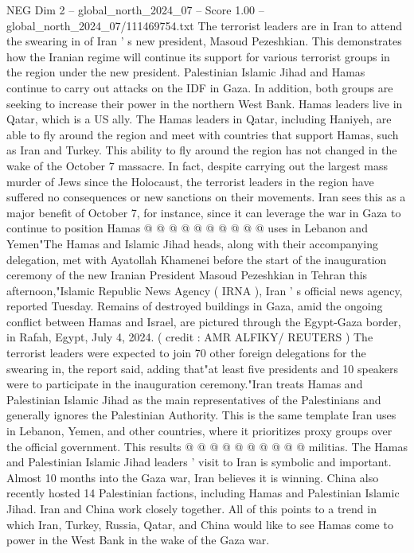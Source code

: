 \begin{textsample}{NEG Dim 2 – global\_north\_2024\_07 – Score 1.00 – global\_north\_2024\_07/111469754.txt}  \label{ex:f2_neg_064}
The terrorist leaders are in Iran to attend the swearing in of Iran ' s new president, Masoud Pezeshkian.
This demonstrates how the Iranian regime will continue its support for various terrorist groups in the region under the new president.
Palestinian Islamic Jihad and Hamas continue to carry out attacks on the IDF in Gaza.
In addition, both groups are seeking to increase their power in the northern West Bank.
Hamas leaders live in Qatar, which is a US ally.
The Hamas leaders in Qatar, including Haniyeh, are able to fly around the region and meet with countries that support Hamas, such as Iran and Turkey.
This ability to fly around the region has not changed in the wake of the October 7 massacre.
In fact, despite carrying out the largest mass murder of Jews since the Holocaust, the terrorist leaders in the region have suffered no consequences or new sanctions on their movements.
Iran sees this as a major benefit of October 7, for instance, since it can leverage the war in Gaza to continue to position Hamas @ @ @ @ @ @ @ @ @ @ uses in Lebanon and Yemen"The Hamas and Islamic Jihad heads, along with their accompanying delegation, met with Ayatollah Khamenei before the start of the inauguration ceremony of the new Iranian President Masoud Pezeshkian in Tehran this afternoon,"Islamic Republic News Agency ( IRNA ), Iran ' s official news agency, reported Tuesday.
Remains of destroyed buildings in Gaza, amid the ongoing conflict between Hamas and Israel, are pictured through the Egypt-Gaza border, in Rafah, Egypt, July 4, 2024. ( credit : AMR ALFIKY/ REUTERS ) The terrorist leaders were expected to join 70 other foreign delegations for the swearing in, the report said, adding that"at least five presidents and 10 speakers were to participate in the inauguration ceremony."Iran treats Hamas and Palestinian Islamic Jihad as the main representatives of the Palestinians and generally ignores the Palestinian Authority.
This is the same template Iran uses in Lebanon, Yemen, and other countries, where it prioritizes proxy groups over the official government.
This results @ @ @ @ @ @ @ @ @ @ militias.
The Hamas and Palestinian Islamic Jihad leaders ' visit to Iran is symbolic and important.
Almost 10 months into the Gaza war, Iran believes it is winning.
China also recently hosted 14 Palestinian factions, including Hamas and Palestinian Islamic Jihad.
Iran and China work closely together.
All of this points to a trend in which Iran, Turkey, Russia, Qatar, and China would like to see Hamas come to power in the West Bank in the wake of the Gaza war.

\end{textsample}
